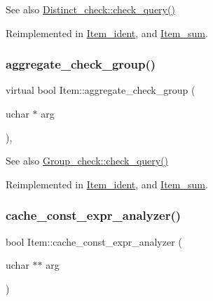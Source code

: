 \begin{DoxySeeAlso}{See also}
\mbox{\hyperlink{group__AGGREGATE__CHECKS_ga83e75b415b78e10ade375ad320ea446c}{Distinct\+\_\+check\+::check\+\_\+query()}} 
\end{DoxySeeAlso}


Reimplemented in \mbox{\hyperlink{classItem__ident_a00ab5f763e017d4892db3d07fc8b13f3}{Item\+\_\+ident}}, and \mbox{\hyperlink{classItem__sum_a469f9e37bdb5f0c186b4fc2190f01fdb}{Item\+\_\+sum}}.

\mbox{\label{classItem_ab828d3602e63ad15f5cfd8ff54339189}} 
\subsubsection{\texorpdfstring{aggregate\+\_\+check\+\_\+group()}{aggregate\_check\_group()}}
{\footnotesize\ttfamily virtual bool Item\+::aggregate\+\_\+check\+\_\+group (\begin{DoxyParamCaption}\item[{uchar $\ast$}]{arg }\end{DoxyParamCaption})\hspace{0.3cm}{\ttfamily [inline]}, {\ttfamily [virtual]}}

\begin{DoxySeeAlso}{See also}
\mbox{\hyperlink{group__AGGREGATE__CHECKS_ga85f98a122e6f9accf528534acb5db686}{Group\+\_\+check\+::check\+\_\+query()}} 
\end{DoxySeeAlso}


Reimplemented in \mbox{\hyperlink{classItem__ident_ae79407fb0ebd076c5a45f16f36512724}{Item\+\_\+ident}}, and \mbox{\hyperlink{classItem__sum_acc4dbcc4a2da3750ff11bf372fd973f5}{Item\+\_\+sum}}.

\mbox{\label{classItem_a1957a7092839e6913cc8c6ed901c7bea}} 
\subsubsection{\texorpdfstring{cache\+\_\+const\+\_\+expr\+\_\+analyzer()}{cache\_const\_expr\_analyzer()}}
{\footnotesize\ttfamily bool Item\+::cache\+\_\+const\+\_\+expr\+\_\+analyzer (\begin{DoxyParamCaption}\item[{uchar $\ast$$\ast$}]{arg }\end{DoxyParamCaption})\hspace{0.3cm}{\ttfamily [virtual]}}

